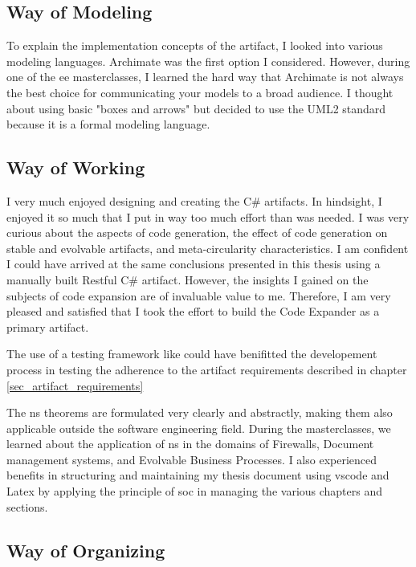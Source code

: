 \subsection{Way of Modeling}

To explain the implementation concepts of the artifact, I looked into various modeling
languages. Archimate was the first option I considered. However, during one of the \gls{ee}
masterclasses, I learned the hard way that Archimate is not always the best choice for
communicating your models to a broad audience. I thought about using basic "boxes and
arrows" but decided to use the UML2 standard because it is a formal modeling language.

\subsection{Way of Working}

I very much enjoyed designing and creating the C\# artifacts. In hindsight, I enjoyed it
so much that I put in way too much effort than was needed. I was very curious about the
aspects of code generation, the effect of code generation on stable and evolvable
artifacts, and meta-circularity characteristics. I am confident I could have arrived at
the same conclusions presented in this thesis using a manually built Restful C\# artifact.
However, the insights I gained on the subjects of code expansion are of invaluable value
to me. Therefore, I am very pleased and satisfied that I took the effort to build the Code
Expander as a primary artifact.

The use of a testing framework like 
\parencite*{github_archunitnet_2023} could have benifitted the developement process in
testing the adherence to the artifact requirements described in chapter
\ref{sec_artifact_requirements}

The \gls{ns} theorems are formulated very clearly and abstractly, making them also
applicable outside the software engineering field. During the masterclasses, we learned
about the application of \gls{ns} in the domains of Firewalls, Document management
systems, and Evolvable Business Processes. I also experienced benefits in structuring and
maintaining my thesis document using \gls{vscode} and Latex by applying the principle of
\gls{soc} in managing the various chapters and sections. 

\subsection{Way of Organizing}


